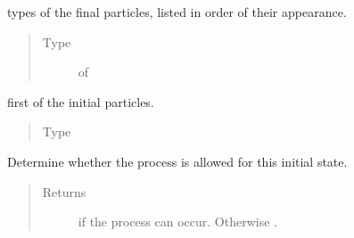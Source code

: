 \documentclass[letterpaper,10pt,english]{sphinxmanual}
\begin{document}
\begin{fulllineitems}
\begin{fulllineitems}
\begin{quote}
\begin{description}
\end{description}\end{quote}

\end{fulllineitems}


\begin{fulllineitems}
\label{\detokenize{code_structure:scdc.interaction.Interaction.final}}
types of the final particles, listed in
order of their appearance.
\begin{quote}\begin{description}
\item[{Type}] \leavevmode
{} of 

\end{description}\end{quote}

\end{fulllineitems}


\begin{fulllineitems}
\label{\detokenize{code_structure:scdc.interaction.Interaction.ip}}
first of the initial particles.
\begin{quote}\begin{description}
\item[{Type}] \leavevmode
{}

\end{description}\end{quote}

\end{fulllineitems}


\begin{fulllineitems}
\label{\detokenize{code_structure:scdc.interaction.Interaction.allowed}}
Determine whether the process is allowed for this initial state.
\begin{quote}\begin{description}
\item[{Returns}] \leavevmode
{} if the process can occur. Otherwise .


\end{description}
\end{quote}
\end{fulllineitems}
\end{fulllineitems}
\end{document}
